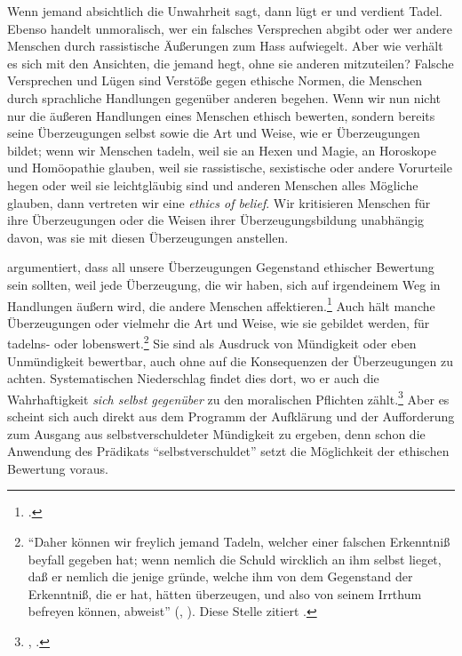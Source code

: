 Wenn jemand absichtlich die Unwahrheit sagt, dann lügt er und verdient Tadel.
Ebenso handelt unmoralisch, wer ein falsches Versprechen abgibt oder wer andere
Menschen durch rassistische Äußerungen zum Hass aufwiegelt. Aber wie verhält es
sich mit den Ansichten, die jemand hegt, ohne sie anderen mitzuteilen? Falsche
Versprechen und Lügen sind Verstöße gegen ethische Normen, die Menschen durch
sprachliche Handlungen gegenüber anderen begehen. Wenn wir nun nicht nur die äußeren
Handlungen eines Menschen ethisch bewerten, sondern bereits seine
Überzeugungen selbst sowie die Art und Weise, wie er Überzeugungen bildet; wenn
wir Menschen tadeln, weil sie an Hexen und Magie, an Horoskope und Homöopathie
glauben, weil sie rassistische, sexistische oder andere Vorurteile hegen oder
weil sie leichtgläubig sind und anderen Menschen alles Mögliche glauben, dann
vertreten wir eine \emph{ethics of belief}. Wir kritisieren Menschen für
ihre Überzeugungen oder die Weisen ihrer Überzeugungsbildung unabhängig davon,
was sie mit diesen Überzeugungen anstellen.

 argumentiert, dass all unsere
Überzeugungen Gegenstand ethischer Bewertung sein sollten, weil jede
Überzeugung, die wir haben, sich auf irgendeinem Weg in Handlungen äußern wird,
die andere Menschen
affektieren.\footnote{\cite[Vgl.][289--295]{Clifford:TheEthicsofBelief1877}.}
Auch  hält manche Überzeugungen oder vielmehr
die Art und Weise, wie sie gebildet werden, für tadelns- oder
lobenswert.\footnote{\enquote{Daher können wir freylich jemand Tadeln, welcher
einer falschen Erkenntniß beyfall gegeben hat; wenn nemlich die Schuld
wircklich an ihm selbst lieget, daß er nemlich die jenige gründe, welche ihm
von dem Gegenstand der Erkenntniß, die er hat, hätten überzeugen, und also von
seinem Irrthum befreyen können, abweist}
\mkbibparens{\cite{Kant:LogikBlomberg1966}, \cite[][XXIV:
160.12--17]{Kant:GesammelteWerke1900ff.}}.
Diese Stelle zitiert \textcite[vgl.][317]{Cohen:KantontheEthicsofBelief2014}.} Sie sind als
Ausdruck von Mündigkeit oder eben Unmündigkeit bewertbar, auch ohne auf die
Konsequenzen der Überzeugungen zu achten. Systematischen Niederschlag findet
dies dort, wo er auch die Wahrhaftigkeit \emph{sich selbst gegenüber} zu den
moralischen Pflichten
zählt.\footnote{\cite[Vgl.][\S~9]{Kant:DieMetaphysikderSitten1977Tugendlehre},
\cite[][VI: 430.9--26]{Kant:GesammelteWerke1900ff.}.} Aber es scheint sich auch
direkt aus dem Programm der Aufklärung und der Aufforderung zum Ausgang aus
selbstverschuldeter Mündigkeit zu ergeben, denn schon die Anwendung des
Prädikats \enquote{selbstverschuldet} setzt die Möglichkeit der ethischen Bewertung voraus.

